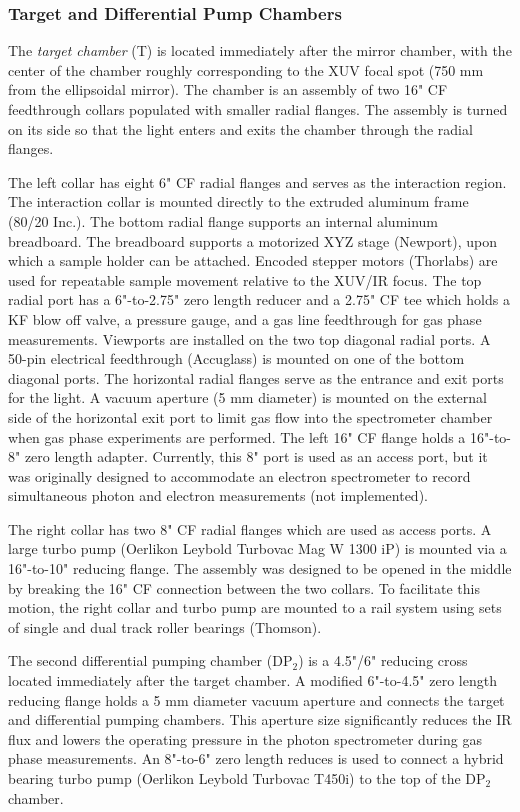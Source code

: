 \subsubsection{Target and  Differential Pump Chambers}

The \textit{target chamber} (T) is located immediately after the mirror chamber, with the center of the chamber roughly corresponding to the XUV focal spot (750 mm from the ellipsoidal mirror). The chamber is an assembly of two 16" CF feedthrough collars populated with smaller radial flanges. The assembly is turned on its side so that the light enters and exits the chamber through the radial flanges.

The left collar has eight 6" CF radial flanges and serves as the interaction region. The interaction collar is mounted directly to the extruded aluminum frame (80/20 Inc.). The bottom radial flange supports an internal aluminum breadboard. The breadboard supports a motorized XYZ stage (Newport), upon which a sample holder can be attached. Encoded stepper motors (Thorlabs) are used for repeatable sample movement relative to the XUV/IR focus. The top radial port has a 6"-to-2.75" zero length reducer and a 2.75" CF tee which holds a KF blow off valve, a pressure gauge, and a gas line feedthrough for gas phase measurements. Viewports are installed on the two top diagonal radial ports. A 50-pin electrical feedthrough (Accuglass) is mounted on one of the bottom diagonal ports. The horizontal radial flanges serve as the entrance and exit ports for the light. A vacuum aperture (5 mm diameter) is mounted on the external side of the horizontal exit port to limit gas flow into the spectrometer chamber when gas phase experiments are performed. The left 16" CF flange holds a 16"-to-8" zero length adapter. Currently, this 8" port is used as an access port, but it was originally designed to accommodate an electron spectrometer to record simultaneous photon and electron measurements (not implemented).

The right collar has two 8" CF radial flanges which are used as access ports. A large turbo pump (Oerlikon Leybold Turbovac Mag W 1300 iP) is mounted via a 16"-to-10" reducing flange. The assembly was designed to be opened in the middle by breaking the 16" CF connection between the two collars. To facilitate this motion, the right collar and turbo pump are mounted to a rail system using sets of single and dual track roller bearings (Thomson).

The second differential pumping chamber (DP$_2$) is a 4.5"/6" reducing cross located immediately after the target chamber. A modified 6"-to-4.5" zero length reducing flange holds a 5 mm diameter vacuum aperture and connects the target and differential pumping chambers. This aperture size significantly reduces the IR flux and lowers the operating pressure in the photon spectrometer during gas phase measurements. An 8"-to-6" zero length reduces is used to connect a hybrid bearing turbo pump (Oerlikon Leybold Turbovac T450i) to the top of the DP$_2$ chamber.

